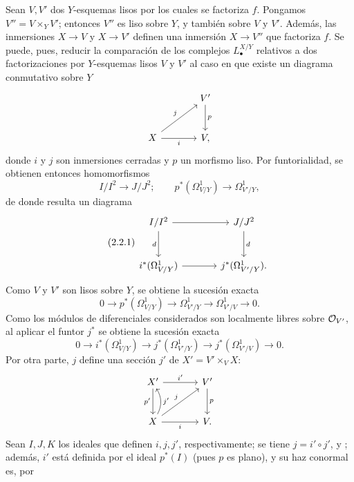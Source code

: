Sean $V,V'$ dos $Y$-esquemas lisos por los cuales se factoriza $f$. Pongamos
$V''=V\times_Y V'$; entonces $V''$ es liso sobre $Y$, y también sobre $V$ y
$V'$. Además, las inmersiones $X\to V$ y $X\to V'$ definen una inmersión
$X\to V''$ que factoriza $f$. Se puede, pues, reducir la comparación de los
complejos $L^{X/Y}_\bullet$ relativos a dos factorizaciones por $Y$-esquemas
lisos $V$ y $V'$ al caso en que existe un diagrama conmutativo sobre $Y$
\[
\begin{tikzcd}[column sep=large,row sep=large]
& V' \arrow[d,"p"]\\
X \arrow[ur,"j"] \arrow[r,"i"'] & V,
\end{tikzcd}
\]
donde $i$ y $j$ son inmersiones cerradas y $p$ un morfismo liso. Por
funtorialidad, se obtienen entonces homomorfismos
\[
I/I^2\longrightarrow J/J^2;
\qquad
p^*(\Omega^1_{V/Y})\longrightarrow\Omega^1_{V'/Y},
\]
de donde resulta un diagrama
\begin{equation}\tag{2.2.1}
\begin{tikzcd}[column sep=large,row sep=large]
I/I^2 \arrow[r] \arrow[d,"d"'] & J/J^2 \arrow[d,"d"]\\
i^*(\Omega^1_{V/Y}) \arrow[r] & j^*(\Omega^1_{V'/Y}).
\end{tikzcd}
\end{equation}
Como $V$ y $V'$ son lisos sobre $Y$, se obtiene la sucesión exacta
\[
0\longrightarrow p^*(\Omega^1_{V/Y})\longrightarrow\Omega^1_{V'/Y}
\longrightarrow\Omega^1_{V'/V}\longrightarrow0.
\]
Como los módulos de diferenciales considerados son localmente libres sobre
$\mathcal O_{\sisi{V}{V'}}$, al aplicar el funtor $j^*$ se obtiene la sucesión exacta %
\begin{equation}\tag{2.2.2}
0\longrightarrow i^*(\Omega^1_{V/Y})\longrightarrow j^*(\Omega^1_{V'/Y})
\longrightarrow j^*(\Omega^1_{V'/V})\longrightarrow0.
\end{equation}
Por otra parte, $j$ define una sección $j'$ de $X'=V'\times_V X$:
\[
\begin{tikzcd}[column sep=large,row sep=large]
X' \arrow[r,"i'"] \arrow[d,"p'"'] & V' \arrow[d,"p"]\\
X \arrow[r,"i"'] \arrow[ur,"j"] \arrow[u,"j'"',bend right] & V .
\end{tikzcd}
\]
Sean $I,J,K$ los ideales que definen $i,j,j'$, respectivamente; se tiene
$j=i'\circ j'$, y ; además, $i'$ está %
definida por el ideal $p^*(I)$ (pues $p$ es plano), y su haz conormal es, por
